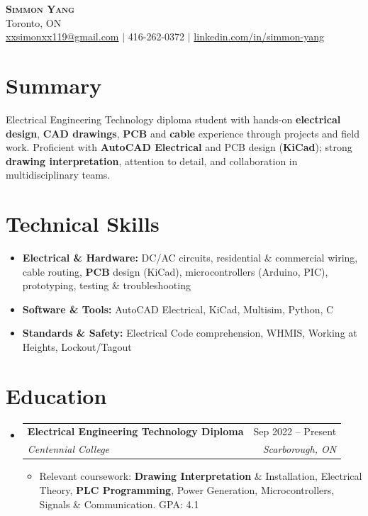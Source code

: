 \documentclass[letterpaper,11pt]{article}
\makeatletter
\newcommand{\resumeItem}[1]{\item\small{{#1 \vspace{-2pt}}}}
\newcommand{\resumeSubheading}[4]{
  \vspace{-4pt}\item
    \begin{tabular*}{0.97\textwidth}[t]{l@{\extracolsep{\fill}}r}
      \textbf{#1} & #2 \\
      \textit{\small #3} & \textit{\small #4} \\
    \end{tabular*}\vspace{-8pt}
}
\newcommand{\resumeSubHeadingListStart}{\begin{itemize}[leftmargin=0.15in, label={}]}
\newcommand{\resumeSubHeadingListEnd}{\end{itemize}}
\newcommand{\resumeItemListStart}{\begin{itemize}}
\newcommand{\resumeItemListEnd}{\end{itemize}\vspace{-5pt}}
\makeatother
\begin{document}
\begin{center}
    \textbf{\Huge \scshape Simmon Yang} \\ \vspace{1pt}
    Toronto, ON \\ 
    \href{mailto:xxsimonxx119@gmail.com}{xxsimonxx119@gmail.com} $|$ 416-262-0372 $|$ 
    \href{https://www.linkedin.com/in/simmon-yang/}{linkedin.com/in/simmon-yang}
\end{center}

\section{Summary}
Electrical Engineering Technology diploma student with hands-on \textbf{electrical design}, \textbf{CAD drawings}, \textbf{PCB} and \textbf{cable} experience through projects and field work. Proficient with \textbf{AutoCAD Electrical} and PCB design (\textbf{KiCad}); strong \textbf{drawing interpretation}, attention to detail, and collaboration in multidisciplinary teams.

\section{Technical Skills}
\begin{itemize}[leftmargin=0.15in]
  \item \textbf{Electrical \& Hardware:} DC/AC circuits, residential \& commercial wiring, cable routing, \textbf{PCB} design (KiCad), microcontrollers (Arduino, PIC), prototyping, testing \& troubleshooting
  \item \textbf{Software \& Tools:} AutoCAD Electrical, KiCad, Multisim, Python, C
  \item \textbf{Standards \& Safety:} Electrical Code comprehension, WHMIS, Working at Heights, Lockout/Tagout
\end{itemize}

\section{Education}
\resumeSubHeadingListStart
\resumeSubheading
  {Electrical Engineering Technology Diploma}{Sep 2022 -- Present}
  {Centennial College}{Scarborough, ON}
\resumeItemListStart
  \resumeItem{Relevant coursework: \textbf{Drawing Interpretation} \& Installation, Electrical Theory, \textbf{PLC Programming}, Power Generation, Microcontrollers, Signals \& Communication. GPA: 4.1}
\resumeItemListEnd
\resumeSubHeadingListEnd
\end{document}
